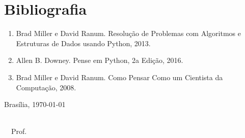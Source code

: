 \documentclass{UnBExam}%
\begin{document}
    \section{Bibliografia}%
        \vspace{-0.5\baselineskip}%
        \begin{enumerate}
            \item Brad Miller e David Ranum. Resolução de Problemas com Algoritmos e Estruturas de Dados usando Python, 2013.
            \vspace{-0.5\baselineskip}%
            \item Allen B. Downey. Pense em Python, 2a Edição, 2016.
            \vspace{-0.5\baselineskip}%
            \item Brad Miller e David Ranum. Como Pensar Como um Cientista da Computação, 2008.
        \end{enumerate}


    \vspace{2em}%
    Brasília, \today \hfill \parbox[t]{75mm} {\hrulefill\\\ \ Prof.}
\end{document}
